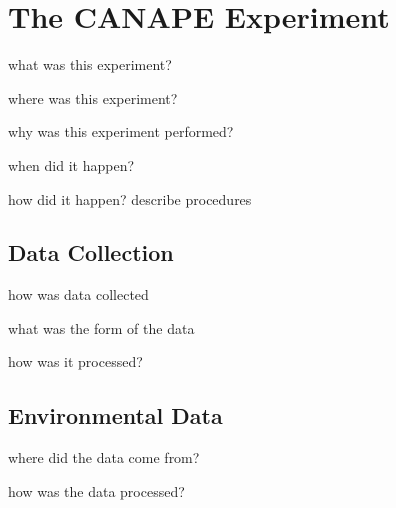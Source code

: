 \section{The CANAPE Experiment}

what was this experiment?

where was this experiment?

why was this experiment performed?

when did it happen?

how did it happen? describe procedures

\subsection{Data Collection}

how was data collected

what was the form of the data

how was it processed?

\subsection{Environmental Data}

where did the data come from?

how was the data processed?

